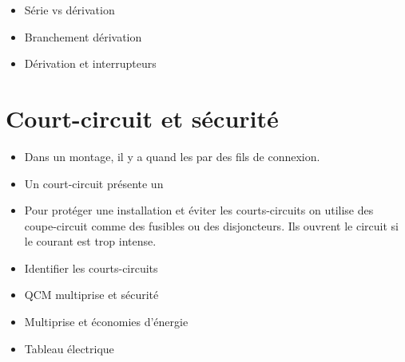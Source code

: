 \documentclass[12pt,a4paper]{article}
\begin{document}
\begin{myexos}
	\begin{itemize}
		\item {} Série vs dérivation
		\item {} Branchement dérivation
		\item {} Dérivation et interrupteurs
	\end{itemize}
\end{myexos}


\section{Court-circuit et sécurité}

\begin{mybilan}
	\begin{itemize}
		\item Dans un montage, il y a  quand les  par des fils de connexion.
		\item Un court-circuit présente un 
		
		\item Pour protéger une installation et éviter les courts-circuits on utilise des coupe-circuit comme des fusibles ou des disjoncteurs. Ils ouvrent le circuit si le courant est trop intense.
	\end{itemize}
\end{mybilan}

\begin{myexos}
	\begin{itemize}
		\item {} Identifier les courts-circuits
		\item {} QCM multiprise et sécurité
		\item {} Multiprise et économies d'énergie
		\item {} Tableau électrique
	\end{itemize}
	
	
\end{myexos}
\end{document}
